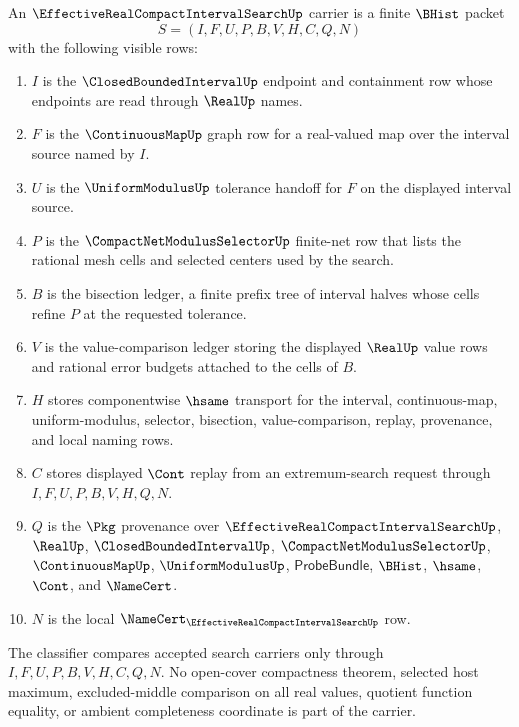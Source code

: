 \begin{definition}
\label{def:effective-real-compact-interval-search-carrier}
An $\EffectiveRealCompactIntervalSearchUp$ carrier is a finite $\BHist$ packet
$$
S=(I,F,U,P,B,V,H,C,Q,N)
$$
with the following visible rows:
\begin{enumerate}
\item $I$ is the $\ClosedBoundedIntervalUp$ endpoint and containment row whose endpoints are read through $\RealUp$ names.
\item $F$ is the $\ContinuousMapUp$ graph row for a real-valued map over the interval source named by $I$.
\item $U$ is the $\UniformModulusUp$ tolerance handoff for $F$ on the displayed interval source.
\item $P$ is the $\CompactNetModulusSelectorUp$ finite-net row that lists the rational mesh cells and selected centers used by the search.
\item $B$ is the bisection ledger, a finite prefix tree of interval halves whose cells refine $P$ at the requested tolerance.
\item $V$ is the value-comparison ledger storing the displayed $\RealUp$ value rows and rational error budgets attached to the cells of $B$.
\item $H$ stores componentwise $\hsame$ transport for the interval, continuous-map, uniform-modulus, selector, bisection, value-comparison, replay, provenance, and local naming rows.
\item $C$ stores displayed $\Cont$ replay from an extremum-search request through $I,F,U,P,B,V,H,Q,N$.
\item $Q$ is the $\Pkg$ provenance over $\EffectiveRealCompactIntervalSearchUp$, $\RealUp$, $\ClosedBoundedIntervalUp$, $\CompactNetModulusSelectorUp$, $\ContinuousMapUp$, $\UniformModulusUp$, $\mathsf{ProbeBundle}$, $\BHist$, $\hsame$, $\Cont$, and $\NameCert$.
\item $N$ is the local $\NameCert_{\EffectiveRealCompactIntervalSearchUp}$ row.
\end{enumerate}
The classifier compares accepted search carriers only through $I,F,U,P,B,V,H,C,Q,N$. No open-cover compactness theorem, selected host maximum, excluded-middle comparison on all real values, quotient function equality, or ambient completeness coordinate is part of the carrier.
\end{definition}

